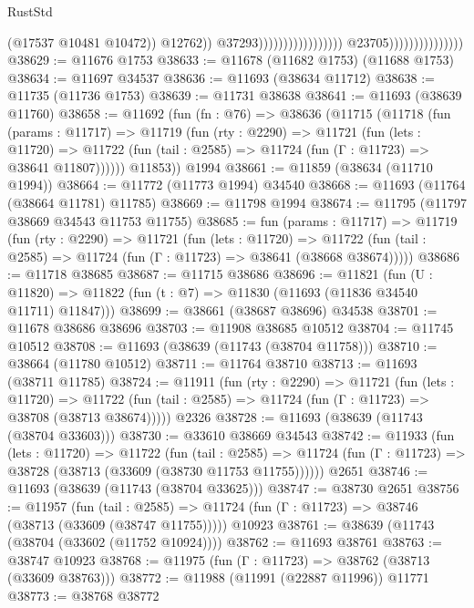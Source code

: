 \begin{lexlean}{RustStd}
\begin{coremodule}
                                                                          (@17537 @10481 @10472))
                                                                        @12762))
                                                                    @37293)))))))))))))))))
                                  @23705)))))))))))))))
@38629 := @11676 @1753
@38633 := @11678 (@11682 @1753) (@11688 @1753)
@38634 := @11697 @34537
@38636 := @11693 (@38634 @11712)
@38638 := @11735 (@11736 @1753)
@38639 := @11731 @38638
@38641 := @11693 (@38639 @11760)
@38658 := @11692
    (fun (fn : @76) =>
    @38636
      (@11715
        (@11718
          (fun (params : @11717) =>
          @11719
            (fun (rty : @2290) =>
            @11721
              (fun (lets : @11720) =>
              @11722 (fun (tail : @2585) => @11724 (fun (Γ : @11723) => @38641 @11807))))))
        @11853))
    @1994
@38661 := @11859 (@38634 (@11710 @1994))
@38664 := @11772 (@11773 @1994) @34540
@38668 := @11693 (@11764 (@38664 @11781) @11785)
@38669 := @11798 @1994
@38674 := @11795 (@11797 @38669 @34543 @11753 @11755)
@38685 := fun (params : @11717) =>
  @11719
    (fun (rty : @2290) =>
    @11721
      (fun (lets : @11720) =>
      @11722 (fun (tail : @2585) => @11724 (fun (Γ : @11723) => @38641 (@38668 @38674)))))
@38686 := @11718 @38685
@38687 := @11715 @38686
@38696 := @11821
    (fun (U : @11820) => @11822 (fun (t : @7) => @11830 (@11693 (@11836 @34540 @11711) @11847)))
@38699 := @38661 (@38687 @38696) @34538
@38701 := @11678 @38686 @38696
@38703 := @11908 @38685 @10512
@38704 := @11745 @10512
@38708 := @11693 (@38639 (@11743 (@38704 @11758)))
@38710 := @38664 (@11780 @10512)
@38711 := @11764 @38710
@38713 := @11693 (@38711 @11785)
@38724 := @11911
    (fun (rty : @2290) =>
    @11721
      (fun (lets : @11720) =>
      @11722 (fun (tail : @2585) => @11724 (fun (Γ : @11723) => @38708 (@38713 @38674)))))
    @2326
@38728 := @11693 (@38639 (@11743 (@38704 @33603)))
@38730 := @33610 @38669 @34543
@38742 := @11933
    (fun (lets : @11720) =>
    @11722
      (fun (tail : @2585) =>
      @11724 (fun (Γ : @11723) => @38728 (@38713 (@33609 (@38730 @11753 @11755))))))
    @2651
@38746 := @11693 (@38639 (@11743 (@38704 @33625)))
@38747 := @38730 @2651
@38756 := @11957
    (fun (tail : @2585) => @11724 (fun (Γ : @11723) => @38746 (@38713 (@33609 (@38747 @11755)))))
    @10923
@38761 := @38639 (@11743 (@38704 (@33602 (@11752 @10924))))
@38762 := @11693 @38761
@38763 := @38747 @10923
@38768 := @11975 (fun (Γ : @11723) => @38762 (@38713 (@33609 @38763)))
@38772 := @11988 (@11991 (@22887 @11996)) @11771
@38773 := @38768 @38772

\end{coremodule}
\end{lexlean}
